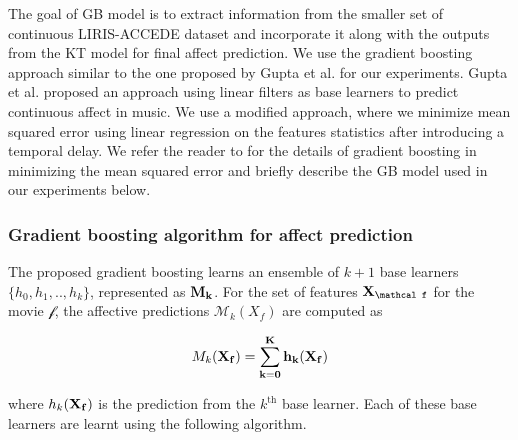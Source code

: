 \documentclass{article}
\begin{document}

The goal of GB model is to extract information from the smaller set of continuous LIRIS-ACCEDE dataset and incorporate it along with the outputs from the KT model for final affect prediction.
We use the gradient boosting approach similar to the one proposed by Gupta et al. \cite{gupta2015affect} for our experiments.
Gupta et al. \cite{gupta2015affect} proposed an approach using linear filters as base learners to predict continuous affect in music. 
We use a modified approach, where we minimize mean squared error using linear regression on the features statistics after introducing a temporal delay.
We refer the reader to \cite{friedman2001greedy,gupta2015affect} for the details of gradient boosting in minimizing the mean squared error and briefly describe the GB model used in our experiments below. 

\subsubsection{Gradient boosting algorithm for affect prediction}
The proposed gradient boosting learns an ensemble of $k+1$ base learners $\{h_0, h_1, .., h_k\}$, represented as $\bf M_k$. 
For the set of features $\bf X_{\mathcal f}$ for the movie $\mathcal f$, the affective predictions $\mathcal M_k(X_f)$ are computed as  

\begin{equation}
\mathcal \bf M_k(\bf X_f) = \sum_{k=0}^K h_k(\bf X_f)
\end{equation}

where $h_k(\bf X_f)$ is the prediction from the $k^\text{th}$ base learner.
Each of these base learners are learnt using the following algorithm.
\end{document}
